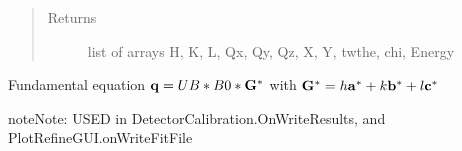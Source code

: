 \documentclass[letterpaper,10pt,english]{sphinxmanual}
\begin{document}
\begin{fulllineitems}
\begin{quote}
\begin{description}
\begin{itemize}
\end{itemize}

\item[{Returns}] \leavevmode
list of arrays H, K, L, Qx, Qy, Qz, X, Y, twthe, chi, Energy

\end{description}\end{quote}

Fundamental equation
\({\bf q} = UB*B0 * {\bf G^*}\)
with \({\bf G^*} = h{\bf a^*}+k{\bf b^*}+l{\bf c^*}\)

\begin{sphinxadmonition}{note}{Note:}
USED in DetectorCalibration.OnWriteResults, and PlotRefineGUI.onWriteFitFile
\end{sphinxadmonition}

\end{fulllineitems}

\end{document}

